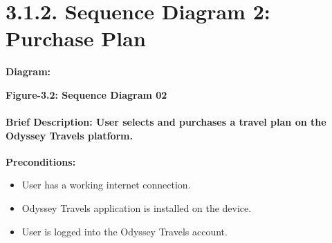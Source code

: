 \documentclass{scrreprt}
\begin{document}
\section*{\textbf{3.1.2. Sequence Diagram 2: Purchase Plan}}
\textbf{Diagram:}
\newline
\newline
\begin{center}
    \parbox{0.8\textwidth}{ 
        \centering
    }
\end{center}

\begin{center}
    \parbox{0.8\textwidth}{ 
        \centering
        \textbf{Figure-3.2: Sequence Diagram 02}
    }
\end{center}
\paragraph {\textnormal{Brief Description: 
User selects and purchases a travel plan on the Odyssey Travels platform.\newline
}}
\textbf{Preconditions:}
\begin{itemize}
    \item User has a working internet connection.
    \item Odyssey Travels application is installed on the device.
    \item User is logged into the Odyssey Travels account.
\end{itemize}
\end{document}
